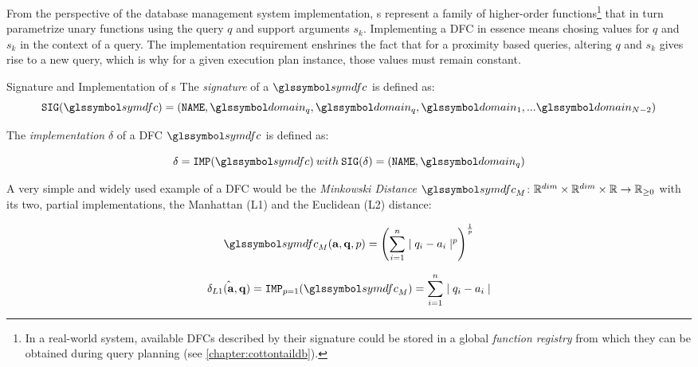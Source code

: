 From the perspective of the database management system implementation, s represent a family of higher-order functions\footnote{In a real-world system, available DFCs described by their signature could be stored in a global \emph{function registry} from which they can be obtained during query planning (see \cref{chapter:cottontaildb}).} that in turn parametrize unary functions using the query $q$ and support arguments $s_k$. Implementing a DFC in essence means chosing values for $q$ and $s_k$ in the context of a query. The implementation requirement enshrines the fact that for a proximity based queries, altering $q$ and $s_k$ gives rise to a new query, which is why for a given execution plan instance, those values must remain constant.

\begin{definition}[label=definition:dfc_sig_imp]{Signature and Implementation of s}{}    
    The \emph{signature} of a  $\symdfc$ is defined as:
    \begin{equation}
        \label{equation:dfc_signature}
        \texttt{SIG}(\symdfc) = (\mathtt{NAME}, \domain_q, \domain_q, \domain_1,... \domain_{N-2})
    \end{equation}

    The \emph{implementation} $\delta$ of a DFC $\symdfc$ is defined as:

    \begin{equation}
        \label{equation:dfc_implementation}
        \delta = \texttt{IMP}(\symdfc) \: with \: \texttt{SIG}(\delta) = (\mathtt{NAME}, \domain_q)
    \end{equation}
\end{definition}

A very simple and widely used example of a DFC would be the \emph{Minkowski Distance} $\symdfc_{M} \colon \mathbb{R}^{dim} \times \mathbb{R}^{dim} \times \mathbb{R} \to \mathbb{R}_{\geq 0}$ with its two, partial implementations, the Manhattan (L1) and the Euclidean (L2) distance:

\begin{equation}
    \symdfc_{M}(\mathbf{a},\mathbf{q},p) = \left(\sum_{i=1}^{n} \mid q_i - a_i \mid^p\right)^{\frac{1}{p}}
\end{equation}

\begin{equation}
    \hat{\delta_{L1}(\mathbf{a},\mathbf{q})} = \texttt{IMP}_{p=1}(\symdfc_M) = \sum_{i=1}^{n} \mid q_i - a_i \mid
\end{equation}

